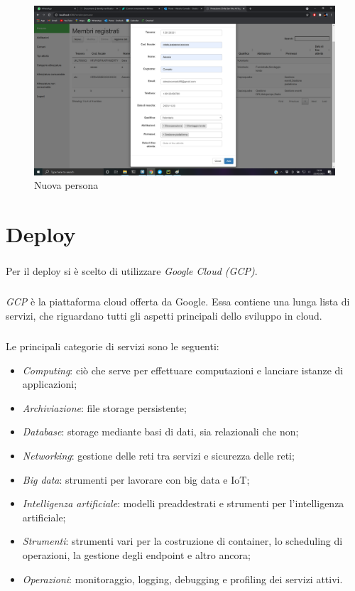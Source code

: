 \documentclass[12pt,a4paper,twoside,english,italian]{book}
\begin{document}
\begin{figure}[H]
    \centering
    \includegraphics[width=1\textwidth]{img/new.png}
    \caption{Nuova persona}
\end{figure}



\chapter{Deploy}

\paragraph{} Per il deploy si è scelto di utilizzare \emph{Google Cloud (GCP)}. 

\paragraph{} \emph{GCP} \cite{gcp} è la piattaforma cloud offerta da Google. Essa contiene una lunga lista di servizi, che riguardano tutti gli aspetti principali dello sviluppo in cloud.  

\paragraph{} Le principali categorie di servizi sono le seguenti:
\begin{itemize}
    \item \emph{Computing}: ciò che serve per effettuare computazioni e lanciare istanze di applicazioni;
    \item \emph{Archiviazione}: file storage persistente;
    \item \emph{Database}: storage mediante basi di dati, sia relazionali che non;
    \item \emph{Networking}: gestione delle reti tra servizi e sicurezza delle reti;
    \item \emph{Big data}: strumenti per lavorare con big data e IoT;
    \item \emph{Intelligenza artificiale}: modelli preaddestrati e strumenti per l'intelligenza artificiale;
    \item \emph{Strumenti}: strumenti vari per la costruzione di container, lo scheduling di operazioni, la gestione degli endpoint e altro ancora;
    \item \emph{Operazioni}: monitoraggio, logging, debugging e profiling dei servizi attivi.
\end{itemize}
\end{document}

